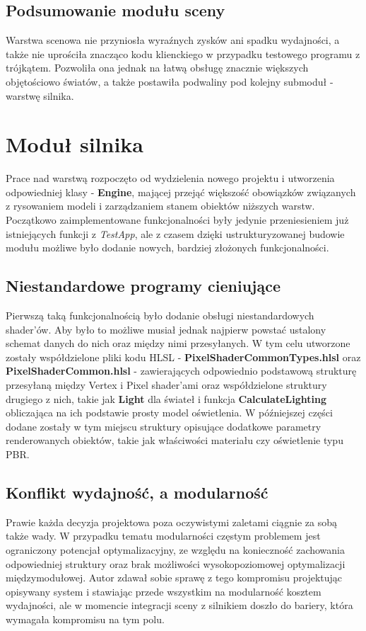 \subsection{Podsumowanie modułu sceny}
Warstwa scenowa nie przyniosła wyraźnych zysków ani spadku wydajności, a także nie uprościła znacząco kodu klienckiego w przypadku testowego programu z trójkątem. Pozwoliła ona jednak na łatwą obsługę znacznie większych objętościowo światów, a także postawiła podwaliny pod kolejny submoduł - warstwę silnika.

\section{Moduł silnika}
Prace nad warstwą rozpoczęto od wydzielenia nowego projektu i utworzenia odpowiedniej klasy - \textbf{Engine}, mającej przejąć większość obowiązków związanych z rysowaniem modeli i zarządzaniem stanem obiektów niższych warstw. Początkowo zaimplementowane funkcjonalności były jedynie przeniesieniem już istniejących funkcji z \textit{TestApp}, ale z czasem dzięki ustrukturyzowanej budowie modułu możliwe było dodanie nowych, bardziej złożonych funkcjonalności. 

\subsection{Niestandardowe programy cieniujące}
Pierwszą taką funkcjonalnością było dodanie obsługi niestandardowych shader'ów. Aby było to możliwe musiał jednak najpierw powstać ustalony schemat danych do nich oraz między nimi przesyłanych. W tym celu utworzone zostały współdzielone pliki kodu HLSL - \textbf{PixelShaderCommonTypes.hlsl} oraz \textbf{PixelShaderCommon.hlsl} - zawierających odpowiednio podstawową strukturę przesyłaną między Vertex i Pixel shader'ami oraz współdzielone struktury drugiego z nich, takie jak \textbf{Light} dla świateł i funkcja \textbf{CalculateLighting} obliczająca na ich podstawie prosty model oświetlenia. W późniejszej części dodane zostały w tym miejscu struktury opisujące dodatkowe parametry renderowanych obiektów, takie jak właściwości materiału czy oświetlenie typu PBR.

\subsection{Konflikt wydajność, a modularność}
Prawie każda decyzja projektowa poza oczywistymi zaletami ciągnie za sobą także wady. W przypadku tematu modularności częstym problemem jest ograniczony potencjał optymalizacyjny, ze względu na konieczność zachowania odpowiedniej struktury oraz brak możliwości wysokopoziomowej optymalizacji międzymodułowej. Autor zdawał sobie sprawę z tego kompromisu projektując opisywany system i stawiając przede wszystkim na modularność kosztem wydajności, ale w momencie integracji sceny z silnikiem doszło do bariery, która wymagała kompromisu na tym polu. 

